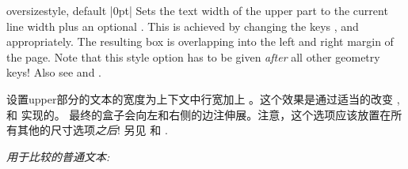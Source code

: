 \begin{docTcbKey}{oversize}{}{style, default |0pt|}
  Sets the text width of the upper part to the current line width plus an
  optional .
  This is achieved by changing the keys 
  , and
   appropriately.
  The resulting box is overlapping into the left and right margin of
  the page.
  Note that this style option has to be given \emph{after} all other
  geometry keys!
  Also see  and .

设置upper部分的文本的宽度为上下文中行宽加上 。这个效果是通过适当的改变  , 和  实现的。
最终的盒子会向左和右侧的边注伸展。注意，这个选项应该放置在所有其他的尺寸选项\emph{之后}!
另见  和 .
\begin{dispListing}

\textit{用于比较的普通文本:}\\
\lipsum[2]

\begin{tcolorbox}[oversize,title=Oversized box]
\lipsum[2]
\end{tcolorbox}

\begin{tcolorbox}[title=Normal box]
\lipsum[2]
\end{tcolorbox}
\end{dispListing}
\end{docTcbKey}

{\tcbusetemp}




  
